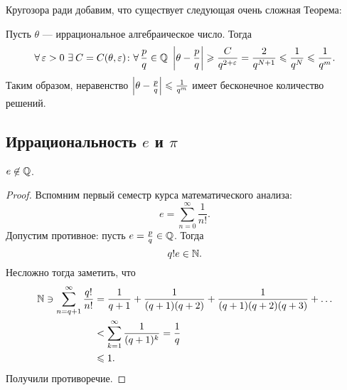 Кругозора ради добавим, что существует следующая очень сложная Теорема:

\begin{ntheorem}
\label{thm:III_Thue-Siegel-Roth}
    Пусть $\theta$ --- иррациональное алгебраическое число. Тогда 
    \[
        \forall \epsilon > 0 \ \exists C = C(\theta, \epsilon)\colon \forall \frac{p}{q} \in \QQ\ \abs{\theta - \frac{p}{q}} \ge \frac{C}{q^{2 + \epsilon}} = \frac{2}{q^{N+1}} \le \frac{1}{q^N} \le \frac{1}{q^m}.
    \]
    Таким образом, неравенство $\left| \theta - \frac{p}{q} \right| \leqslant \frac{1}{q^m}$ имеет бесконечное количество решений.
\end{ntheorem}


\subsection{\texorpdfstring{Иррациональность $e$ и $\pi$}{Иррациональность e и π}}
\label{subsec:III-2}

\begin{ntheorem}
\label{thm:III_E-irrationality}
    $e \not\in \mathbb{Q}$.
\end{ntheorem}
\begin{proof}
    Вспомним первый семестр курса математического анализа:
    \[
        e = \sum_{n=0}^{\infty} \frac{1}{n!}.
    \]
    Допустим противное: пусть $e = \frac{p}{q} \in \mathbb{Q}$. Тогда 
    \[
        q!e \in \mathbb{N}.
    \]
    Несложно тогда заметить, что 
    \begin{align*}
        \mathbb{N} \ni \sum_{n=q+1}^{\infty} \frac{q!}{n!} &= \frac{1}{q+1} + \frac{1}{(q+1)(q+2)} + \frac{1}{(q+1)(q+2)(q+3)} + \dots \\
        &< \sum_{k=1}^{\infty} \frac{1}{(q+1)^k} = \frac{1}{q} \\
        &\leqslant 1.
    \end{align*}
    Получили противоречие.
\end{proof}

